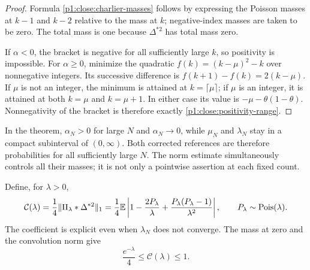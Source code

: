 \begin{proof}
Formula \eqref{p1:close:charlier-masses} follows by expressing
the Poisson masses at $k-1$ and $k-2$ relative to the mass
at $k$; negative-index masses are taken to be zero.
The total mass is one because $\Delta^{*2}$ has total mass
zero.

If $\alpha<0$, the bracket is negative for all sufficiently
large $k$, so positivity is impossible.
For $\alpha\ge0$, minimize the quadratic
$f(k)=(k-\mu)^2-k$ over nonnegative integers.
Its successive difference is $f(k+1)-f(k)=2(k-\mu)$.
If $\mu$ is not an integer, the minimum is attained at
$k=\lceil\mu\rceil$; if $\mu$ is an integer, it is attained
at both $k=\mu$ and $k=\mu+1$.  In either case its value is
$-\mu-\theta(1-\theta)$.  Nonnegativity of the bracket
is therefore exactly \eqref{p1:close:positivity-range}.
\end{proof}

In the theorem, $\alpha_N>0$ for large $N$ and $\alpha_N\to0$,
while $\mu_N$ and $\lambda_N$ stay in a compact subinterval
of $(0,\infty)$.  Both corrected references are therefore
probabilities for all sufficiently large $N$.
The norm estimate simultaneously controls all their masses;
it is not only a pointwise assertion at each fixed count.

Define, for $\lambda>0$,
\begin{equation}
 \mathcal C(\lambda)
   =\frac14\|\Pi_\lambda*\Delta^{*2}\|_1
   =\frac14\mathbb E\left|
       1-\frac{2P_\lambda}{\lambda}
          +\frac{P_\lambda(P_\lambda-1)}{\lambda^2}
                   \right|,
 \qquad P_\lambda\sim\operatorname{Pois}(\lambda).
 \label{p1:close:charlier-constant}
\end{equation}
The coefficient is explicit even when $\lambda_N$ does not
converge.  The mass at zero and the convolution norm give
\begin{equation}
 \frac{e^{-\lambda}}4\le\mathcal C(\lambda)\le1.
 \label{p1:close:constant-bounds}
\end{equation}
